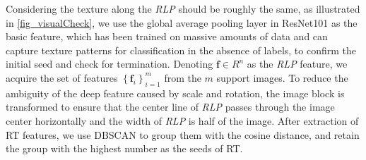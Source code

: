 Considering the texture along the \textit{RLP} should be roughly the same, 
as illustrated in \cref{fig_visualCheck},
we use the global average pooling layer in ResNet101 as the basic feature,
which has been trained on massive amounts of data and can capture texture patterns for classification in the absence of labels,
to confirm the initial seed and check for termination.
Denoting $\mathbf f \in R^n$ as the \textit{RLP} feature,
we acquire the set of features $\left\{\mathbf f_i\right\}_{i=1}^m$ from the $m$ support images.
To reduce the ambiguity of the deep feature caused by scale and rotation,
the image block is transformed to ensure that the center line of \textit{RLP} passes through the image center horizontally and the width of \textit{RLP} is half of the image.
After extraction of RT features, 
we use DBSCAN to group them with the cosine distance,
and retain the group with the highest number as the seeds of RT.



